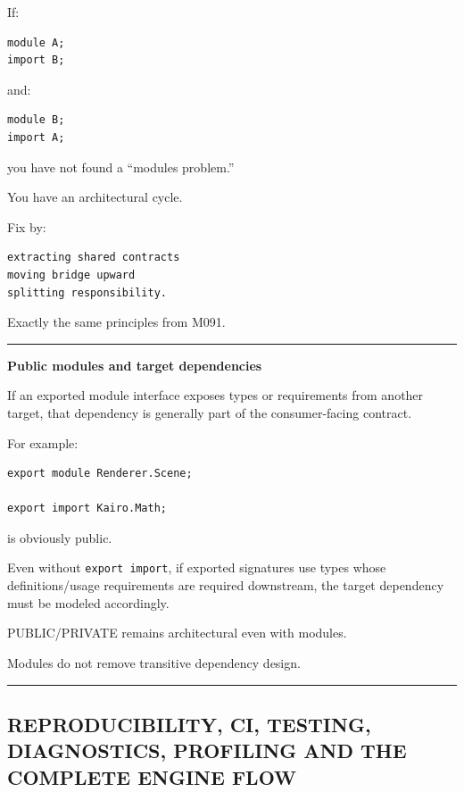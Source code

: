 If:

\begin{verbatim}
module A;
import B;
\end{verbatim}

and:

\begin{verbatim}
module B;
import A;
\end{verbatim}

you have not found a ``modules problem.''

You have an architectural cycle.

Fix by:

\begin{verbatim}
extracting shared contracts
moving bridge upward
splitting responsibility.
\end{verbatim}

Exactly the same principles from M091.

\begin{center}\rule{0.5\linewidth}{0.5pt}\end{center}

\textbf{Public modules and target dependencies}

If an exported module interface exposes types or requirements from another target, that dependency is generally part of the consumer-facing contract.

For example:

\begin{verbatim}
export module Renderer.Scene;

export import Kairo.Math;
\end{verbatim}

is obviously public.

Even without \texttt{export\ import}, if exported signatures use types whose definitions/usage requirements are required downstream, the target dependency must be modeled accordingly.

PUBLIC/PRIVATE remains architectural even with modules.

Modules do not remove transitive dependency design.

\begin{center}\rule{0.5\linewidth}{0.5pt}\end{center}

\subsection{REPRODUCIBILITY, CI, TESTING, DIAGNOSTICS, PROFILING AND THE COMPLETE ENGINE FLOW}\label{01-foundations-i-ch010-reproducibility-ci-testing-diagnostics-profiling-and-the-complete-engine-flow}

